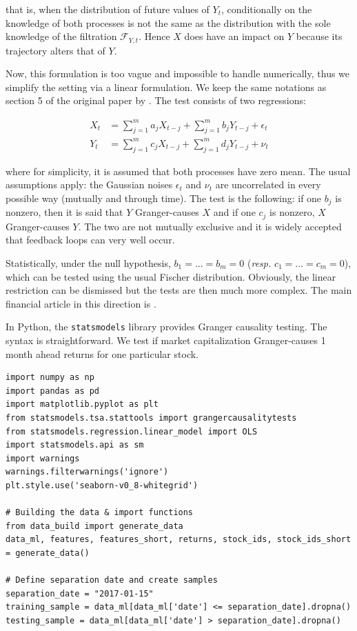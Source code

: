 that is, when the distribution of future values of $Y_t$, conditionally on the knowledge of both processes is not the same as the distribution with the sole knowledge of the filtration $\mathcal{F}_{Y,t}$. Hence $X$ does have an impact on $Y$ because its trajectory alters that of $Y$.

Now, this formulation is too vague and impossible to handle numerically, thus we simplify the setting via a linear formulation. We keep the same notations as section 5 of the original paper by \cite{granger1969investigating}. The test consists of two regressions:

\begin{align*}
X_t&=\sum_{j=1}^ma_jX_{t-j}+\sum_{j=1}^mb_jY_{t-j} + \epsilon_t \\
Y_t&=\sum_{j=1}^mc_jX_{t-j}+\sum_{j=1}^md_jY_{t-j} + \nu_t
\end{align*}

where for simplicity, it is assumed that both processes have zero mean. The usual assumptions apply: the Gaussian noises $\epsilon_t$ and $\nu_t$ are uncorrelated in every possible way (mutually and through time). The test is the following: if one $b_j$ is nonzero, then it is said that $Y$ Granger-causes $X$ and if one $c_j$ is nonzero, $X$ Granger-causes $Y$. The two are not mutually exclusive and it is widely accepted that feedback loops can very well occur.

Statistically, under the null hypothesis, $b_1=\dots=b_m=0$ (\textit{resp.} $c_1=\dots=c_m=0$), which can be tested using the usual Fischer distribution. Obviously, the linear restriction can be dismissed but the tests are then much more complex. The main financial article in this direction is \cite{hiemstra1994testing}.

In Python, the \texttt{statsmodels} library provides Granger causality testing. The syntax is straightforward. We test if market capitalization Granger-causes 1 month ahead returns for one particular stock.

\begin{verbatim}
import numpy as np
import pandas as pd
import matplotlib.pyplot as plt
from statsmodels.tsa.stattools import grangercausalitytests
from statsmodels.regression.linear_model import OLS
import statsmodels.api as sm
import warnings
warnings.filterwarnings('ignore')
plt.style.use('seaborn-v0_8-whitegrid')

# Building the data & import functions
from data_build import generate_data
data_ml, features, features_short, returns, stock_ids, stock_ids_short = generate_data()

# Define separation date and create samples
separation_date = "2017-01-15"
training_sample = data_ml[data_ml['date'] <= separation_date].dropna()
testing_sample = data_ml[data_ml['date'] > separation_date].dropna()
\end{verbatim}

